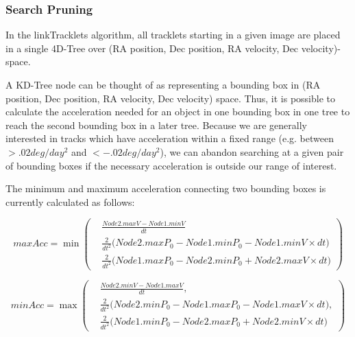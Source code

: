 \subsubsection{Search Pruning}

In the linkTracklets algorithm, all tracklets starting in a given
image are placed in a single 4D-Tree over (RA position, Dec position,
RA velocity, Dec velocity)-space.  

A KD-Tree node can be thought of as representing a bounding box in (RA
position, Dec position, RA velocity, Dec velocity) space.  Thus, it is
possible to calculate the acceleration needed for an object in one
bounding box in one tree to reach the second bounding box in a later
tree.  Because we are generally interested in tracks which have
acceleration within a fixed range (e.g. between $>.02 deg/day^2$ and
$<-.02 deg/day^2$), we can abandon searching at a given pair of
bounding boxes if the necessary acceleration is outside our range of
interest.

The minimum and maximum acceleration connecting two bounding boxes is
currently calculated as follows:


\begin{equation}
maxAcc = \min  \left(\begin{array}{ccc} & \displaystyle \frac{Node2.maxV - Node1.minV}{dt} \\
& \displaystyle \frac{2}{dt^2} \bigg(Node2.maxP_0 - Node1.minP_0 - Node1.minV \times dt \bigg) \\
& \displaystyle \frac{2}{dt^2} \bigg(Node1.maxP_0 - Node2.minP_0 + Node2.maxV \times dt \bigg) \end{array}\right)
\end{equation}

\begin{equation}
minAcc  = \max  \left(\begin{array}{ccc} & \displaystyle \frac{Node2.minV - Node1.maxV}{dt},\\
& \displaystyle \frac{2}{dt^2} \bigg( Node2.minP_0 - Node1.maxP_0 - \displaystyle Node1.maxV \times dt\bigg), \\
& \displaystyle \frac{2}{dt^2} \bigg(Node1.minP_0 - Node2.maxP_0 + Node2.minV \times dt\bigg) \end{array} \right)
\end{equation}


